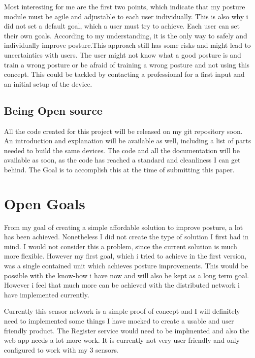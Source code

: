 Most interesting for me are the first two points, which indicate that my posture module must be agile and adjustable to each user individually. This is also why i did not set a default goal, which a user must try to achieve. Each user can set their own goals. According to my understanding, it is the only way to safely and individually improve posture.This approach still has some risks and might lead to uncertainties with users. 
The user might not know what a good posture is and train a wrong posture or be afraid of training a wrong posture and not using this concept. This could be tackled by contacting a professional for a first input and an initial setup of the device.

\subsection{Being Open source}

All the code created for this project will be released on my git repository soon. An introduction and explanation will be available as well, including a list of parts needed to build the same devices. The code and all the documentation will be available as soon, as the code has reached a standard and cleanliness I can get behind. The Goal is to accomplish this at the time of submitting this paper.

\section{Open Goals}

From my goal of creating a simple affordable solution to improve posture, a lot has been achieved. Nonetheless I did not create the type of solution I first had in mind. I would not consider this a problem, since the current solution is much more flexible. However my first goal, which i tried to achieve in the first version, was a single contained unit which achieves posture improvements. This would be possible with the know-how i have now and will also be kept as a long term goal. However i feel that much more can be achieved with the distributed network i have implemented currently. 

Currently this sensor network is a simple proof of concept and I will definitely need to implemented some things I have mocked to create a usable and user friendly product.  The Register service would need to be implmented and also the web app needs a lot more work. It is currently not very user friendly and only configured to work with my 3 sensors. 

